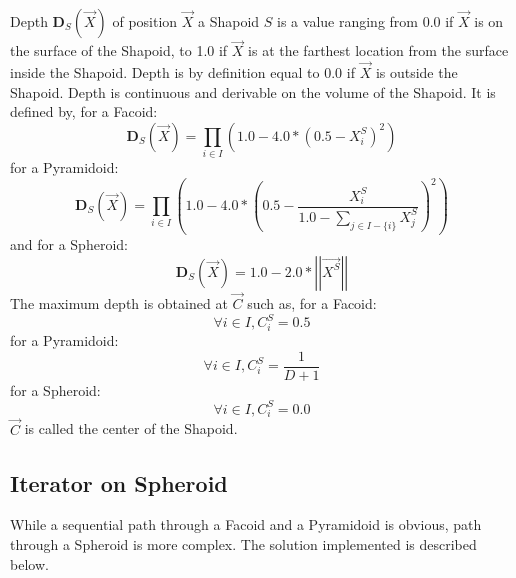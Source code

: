 Depth $\mathbf{D}_S(\overrightarrow{X})$ of position $\overrightarrow{X}$ a Shapoid $S$ is a value ranging from 0.0 if $\overrightarrow{X}$ is on the surface of the Shapoid, to 1.0 if $\overrightarrow{X}$ is at the farthest location from the surface inside the Shapoid. Depth is by definition equal to 0.0 if $\overrightarrow{X}$ is outside the Shapoid. Depth is continuous and derivable on the volume of the Shapoid. It is defined by, for a Facoid:\\
\begin{equation}
\mathbf{D}_S(\overrightarrow{X})=\prod_{i\in I}\left(1.0-4.0*(0.5-X^S_i)^2\right)
\end{equation}
for a Pyramidoid:\\
\begin{equation}
\mathbf{D}_S(\overrightarrow{X})=\prod_{i\in I}\left(1.0-4.0*\left(0.5-\frac{X^S_i}{1.0-\sum_{j\in I-\lbrace i\rbrace}X^S_j}\right)^2\right)
\end{equation}
and for a Spheroid:\\
\begin{equation}
\mathbf{D}_S(\overrightarrow{X})=1.0-2.0*\left|\left|\overrightarrow{X^S}\right|\right|
\end{equation}
The maximum depth is obtained at $\overrightarrow{C}$ such as, for a Facoid:\\
\begin{equation}
\forall i\in I,C_i^S=0.5
\end{equation}
for a Pyramidoid:\\
\begin{equation}
\forall i\in I,C_i^S=\frac{1}{D+1}
\end{equation}
for a Spheroid:\\
\begin{equation}
\forall i\in I,C_i^S=0.0
\end{equation}
$\overrightarrow{C}$ is called the center of the Shapoid.

\subsection{Iterator on Spheroid}

While a sequential path through a Facoid and a Pyramidoid is obvious, path through a Spheroid is more complex. The solution implemented is described below.\\

